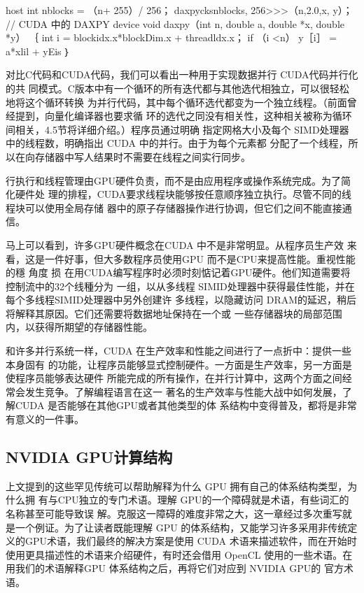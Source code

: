 host
int nblocks = （n+ 255）/ 256；
daxpycksnblocks, 256>>>（n,2.0,x, y）；
// CUDA 中的 DAXPY
device
void daxpy（int n, double a, double *x, double *y）
｛
int i = blockidx.x*blockDim.x + threadldx.x；
if （i <n） y［i］ = a*xlil + yEis
｝

对比C代码和CUDA代码，我们可以看出一种用于实现数据并行 CUDA代码并行化的共
同模式。C版本中有一个循环的所有迭代都与其他选代相独立，可以很轻松地将这个循环转换
为并行代码，其中每个循环选代都变为一个独立线程。（前面曾经提到，向量化编译器也要求循
环的选代之同没有相关性，这种相关被称为循环间相关，4.5节将详细介绍。）程序员通过明确
指定网格大小及每个 SIMD处理器中的线程数，明确指出 CUDA 中的并行。由于为每个元素都
分配了一个线程，所以在向存储器中写人结果时不需要在线程之间实行同步。

行执行和线程管理由GPU硬件负责，而不是由应用程序或操作系统完成。为了简化硬件处
理的排程，CUDA要求线程块能够按任意顺序独立执行。尽管不同的线程块可以使用全局存储
器中的原子存储器操作进行协调，但它们之间不能直接通信。

马上可以看到，许多GPU硬件概念在CUDA 中不是非常明显。从程序员生产效
来看，这是一件好事，但大多数程序员使用GPU 而不是CPU来提高性能。重视性能的穩
角度
损
在用CUDA编写程序时必须时刻惦记着GPU硬件。他们知道需要将控制流中的32个线種分为
一组，以从多线程 SIMID处理器中获得最佳性能，并在每个多线程SIMID处理器中另外创建许
多线程，以隐藏访问 DRAM的延迟，稍后将解释其原因。它们还需要将数据地址保持在一个或
一些存储器块的局部范围内，以获得所期望的存储器性能。

和许多并行系统一样，CUDA 在生产效率和性能之间进行了一点折中：提供一些本身固有
的功能，让程序员能够显式控制硬件。一方面是生产效率，另一方面是使程序员能够表达硬件
所能完成的所有操作，在并行计算中，这两个方面之间经常会发生竞争。了解编程语言在这一
著名的生产效率与性能大战中如何发展，了解CUDA 是否能够在其他GPU或者其他类型的体
系结构中变得普及，都将是非常有意义的一件事。
\subsection{NVIDIA GPU计算结构}
上文提到的这些罕见传统可以帮助解释为什么 GPU 拥有自己的体系结构类型，为什么拥
有与CPU独立的专门术语。理解 GPU的一个障碍就是术语，有些词汇的名称甚至可能导致误
解。克服这一障碍的难度非常之大，这一章经过多次重写就是一个例证。为了让读者既能理解
GPU 的体系结构，又能学习许多采用非传统定义的GPU术语，我们最终的解决方案是使用
CUDA 术语来描述软件，而在开始时使用更具描述性的术语来介绍硬件，有时还会借用 OpenCL
使用的一些术语。在用我们的术语解释GPU 体系结构之后，再将它们对应到 NVIDIA GPU的
官方术语。

